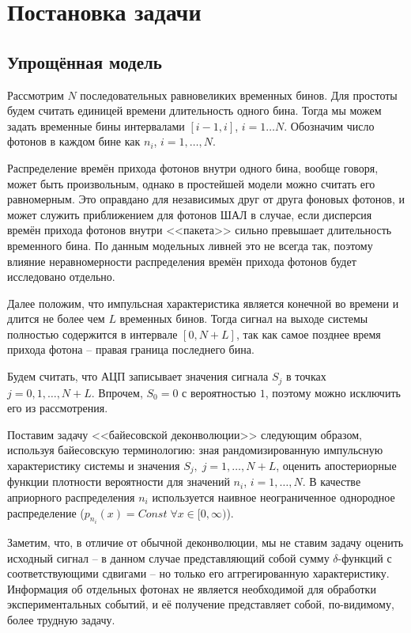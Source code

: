 \documentclass[12pt]{article}
\begin{document}
	\section{Постановка задачи}
	
	\subsection{Упрощённая модель}
	
	Рассмотрим $N$ последовательных равновеликих временных бинов. Для простоты будем считать единицей времени длительность одного бина. Тогда мы можем задать временные бины интервалами $[i-1, i]$, $i = 1 \ldots N$. Обозначим число фотонов в каждом бине как $n_i$, $i = 1, \ldots, N$.
	
	Распределение времён прихода фотонов внутри одного бина, вообще говоря, может быть произвольным, однако в простейшей модели можно считать его равномерным. Это оправдано для независимых друг от друга фоновых фотонов, и может служить приближением для фотонов ШАЛ в случае, если дисперсия времён прихода фотонов внутри <<пакета>> сильно превышает длительность временного бина. По данным модельных ливней это не всегда так, поэтому влияние неравномерности распределения времён прихода фотонов будет исследовано отдельно.
	
	Далее положим, что импульсная характеристика является конечной во времени и длится не более чем $L$ временных бинов. Тогда сигнал на выходе системы полностью содержится в интервале $[0, N + L]$, так как самое позднее время прихода фотона -- правая граница последнего бина.
	
	Будем считать, что АЦП записывает значения сигнала $S_j$ в точках $j = 0, 1, \ldots, N + L$. Впрочем, $S_0 = 0$ с вероятностью $1$, поэтому можно исключить его из рассмотрения.
	
	Поставим задачу <<байесовской деконволюции>> следующим образом, используя байесовскую терминологию: зная рандомизированную импульсную характеристику системы и значения $S_j, \; j = 1, \ldots, N + L$, оценить апостериорные функции плотности вероятности для значений $n_i$, $i = 1, \ldots, N$. В качестве априорного распределения $n_i$ используется наивное неограниченное однородное распределение ($p_{n_i}(x) = Const \; \forall x \in [0, \infty)$).
	
	Заметим, что, в отличие от обычной деконволюции, мы не ставим задачу оценить исходный сигнал -- в данном случае представляющий собой сумму $\delta$-функций с соответствующими сдвигами -- но только его аггрегированную характеристику. Информация об отдельных фотонах не является необходимой для обработки экспериментальных событий, и её получение представляет собой, по-видимому, более трудную задачу.
	
\end{document}
